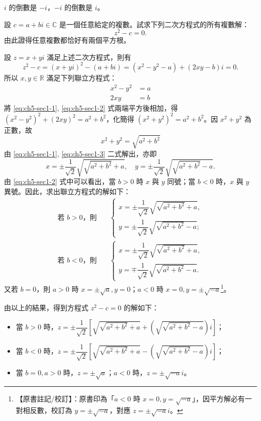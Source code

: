 \begin{example}
$i$ 的倒數是 $-i$，$-i$ 的倒數是 $i$。
\end{example}

\begin{discussion}
設 $c=a+bi \in \mathbb{C}$ 是一個任意給定的複數。試求下列二次方程式的所有複數解：
\[
z^2-c=0.
\]
由此證得任意複數都恰好有兩個平方根。
\end{discussion}

\begin{solution}
設 $z=x+yi$ 滿足上述二次方程式，則有
\[
z^2-c = (x+yi)^2-(a+bi) = (x^2-y^2-a)+(2xy-b)i = 0.
\]
所以 $x, y \in \mathbb{R}$ 滿足下列聯立方程式：
\begin{align}
x^2-y^2 &= a \label{eq:ch5-sec1-1} \\
2xy &= b \label{eq:ch5-sec1-2}
\end{align}
將 \eqref{eq:ch5-sec1-1}, \eqref{eq:ch5-sec1-2} 式兩端平方後相加，得 $(x^2-y^2)^2+(2xy)^2 = a^2+b^2$，化簡得 $(x^2+y^2)^2 = a^2+b^2$。因 $x^2+y^2$ 為正數，故
\begin{equation}
x^2+y^2 = \sqrt{a^2+b^2} \label{eq:ch5-sec1-3}
\end{equation}
由 \eqref{eq:ch5-sec1-1}, \eqref{eq:ch5-sec1-3} 二式解出，亦即
\[
x = \pm \frac{1}{\sqrt{2}}\sqrt{\sqrt{a^2+b^2}+a}, \quad y = \pm\frac{1}{\sqrt{2}}\sqrt{\sqrt{a^2+b^2}-a}.
\]
由 \eqref{eq:ch5-sec1-2} 式中可以看出，當 $b>0$ 時 $x$ 與 $y$ 同號；當 $b<0$ 時，$x$ 與 $y$ 異號。因此，求出聯立方程式的解如下：
\begin{align*}
\text{若 } b>0\text{，則} \quad & \begin{cases} x = \pm\dfrac{1}{\sqrt{2}}\sqrt{\sqrt{a^2+b^2}+a}, \\ y = \pm\dfrac{1}{\sqrt{2}}\sqrt{\sqrt{a^2+b^2}-a}; \end{cases} \\
\text{若 } b<0\text{，則} \quad & \begin{cases} x = \pm\dfrac{1}{\sqrt{2}}\sqrt{\sqrt{a^2+b^2}+a}, \\ y = \mp\dfrac{1}{\sqrt{2}}\sqrt{\sqrt{a^2+b^2}-a}. \end{cases}
\end{align*}
又若 $b=0$，則 $a>0$ 時 $x=\pm\sqrt{a}, y=0$；$a<0$ 時 $x=0, y=\pm\sqrt{-a}$\label{note:b4-ch5-p259-errata}\footnote{【原書註記/校訂】：原書印為「$a<0$ 時 $x=0, y=\sqrt{-a}$」，因平方解必有一對相反數，校訂為 $y=\pm\sqrt{-a}$，對應 $z=\pm\sqrt{-a}i$。}。

由以上的結果，得到方程式 $z^2-c=0$ 的解如下：
\begin{itemize}
  \item 當 $b>0$ 時，$z = \pm\dfrac{1}{\sqrt{2}}\left[\sqrt{\sqrt{a^2+b^2}+a} + \left(\sqrt{\sqrt{a^2+b^2}-a}\right)i\right]$；
  \item 當 $b<0$ 時，$z = \pm\dfrac{1}{\sqrt{2}}\left[\sqrt{\sqrt{a^2+b^2}+a} - \left(\sqrt{\sqrt{a^2+b^2}-a}\right)i\right]$；
  \item 當 $b=0, a>0$ 時，$z = \pm\sqrt{a}$；$a<0$ 時，$z = \pm\sqrt{-a}i$。 \qedhere
\end{itemize}
\end{solution}

